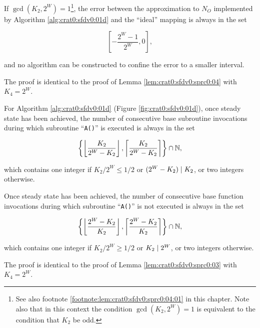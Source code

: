 \begin{vworklemmastatement}
\label{lem:crat0:sfdv0:sprx1:03}
If $\gcd(K_2, 2^W)=1$\footnote{See also footnote \ref{footnote:lem:crat0:sfdv0:sprc0:04:01}
in this chapter.  Note also that in this context the condition $\gcd(K_2, 2^W)=1$ 
is equivalent to the condition that $K_2$ be odd.}, the error between
the approximation to $N_O$ implemented by Algorithm \ref{alg:crat0:sfdv0:01d} 
and the ``ideal'' mapping is always
in the set

\begin{equation}
\label{eq:lem:crat0:sfdv0:sprx1:03:01}
\left[ - \frac{2^W - 1}{2^W} , 0 \right] ,
\end{equation}

and no algorithm can be constructed to 
confine the error to a smaller interval.
\end{vworklemmastatement}
\begin{vworklemmaproof}
The proof is identical to the proof of Lemma 
\ref{lem:crat0:sfdv0:sprc0:04} with $K_4 = 2^W$.
\end{vworklemmaproof}

\begin{vworklemmastatement}
\label{lem:crat0:sfdv0:sprx1:04}
For Algorithm \ref{alg:crat0:sfdv0:01d}
(Figure \ref{fig:crat0:sfdv0:01d}), once steady
state has been achieved, the number of consecutive
base subroutine invocations during which subroutine
``\texttt{A()}'' is executed is always in the set

\begin{equation}
\label{eq:lem:crat0:sfdv0:sprx1:04:01}
\left\{
\left\lfloor \frac{K_2}{2^W - K_2} \right\rfloor ,
\left\lceil  \frac{K_2}{2^W - K_2} \right\rceil
\right\} \cap {\mathbb{N}},
\end{equation}

which contains one integer if $K_2/2^W \leq 1/2$ or $(2^W-K_2) \mid K_2$, 
or two integers otherwise.

Once steady state has been achieved, the number of
consecutive base function invocations during which
subroutine ``\texttt{A()}'' is not executed is
always in the set

\begin{equation}
\label{eq:lem:crat0:sfdv0:sprx1:04:02}
\left\{
\left\lfloor \frac{2^W-K_2}{K_2} \right\rfloor ,
\left\lceil  \frac{2^W-K_2}{K_2} \right\rceil
\right\} \cap {\mathbb{N}},
\end{equation}

which contains one integer if $K_2/2^W \geq 1/2$ or $K_2 \mid 2^W$,
or two integers otherwise.
\end{vworklemmastatement}
\begin{vworklemmaproof}
The proof is identical to the proof of Lemma 
\ref{lem:crat0:sfdv0:sprc0:03} with $K_4 = 2^W$.
\end{vworklemmaproof}
\vworklemmafooter{}


